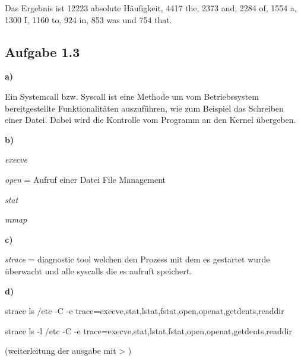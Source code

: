 \documentclass[a4paper,graphics,11pt]{article}
\newcommand{\aufgabe}[1]{\subsection*{Aufgabe #1}}
\begin{document}


Das Ergebnis ist 12223 absolute Häufigkeit, 4417 the, 2373 and, 2284 of, 1554 a, 1300 I, 1160 to, 924 in, 853 was und 754 that.

\aufgabe{1.3}
\textbf{a)}

Ein Systemcall bzw. Syscall ist eine Methode um vom Betriebssystem bereitgestellte Funktionalitäten auszuführen, wie zum Beispiel das Schreiben einer Datei. Dabei wird die Kontrolle vom Programm an den Kernel übergeben.

\textbf{b)}

\textit{execve}

\textit{open} = Aufruf einer Datei File Management

\textit{stat}

\textit{mmap}

\textbf{c)}

\textit{strace} = diagnostic tool welchen den Prozess mit dem es gestartet wurde überwacht und alle syscalls die es aufruft speichert.

\textbf{d)}

strace ls /etc -C -e trace=execve,stat,lstat,fstat,open,openat,getdents,readdir

strace ls -l /etc -C -e trace=execve,stat,lstat,fstat,open,openat,getdents,readdir

(weiterleitung der ausgabe mit > )
\end{document}

